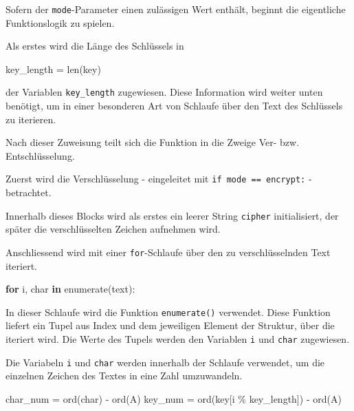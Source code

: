 \documentclass[
  nswissgerman,
  a4paper,
  DIV=11,
  numbers=noendperiod,
  ngerman]{scrreprt}
\newenvironment{Shaded}{\begin{snugshade}}{\end{snugshade}}
\newcommand{\BuiltInTok}[1]{\textcolor[rgb]{0.00,0.23,0.31}{#1}}
\newcommand{\ControlFlowTok}[1]{\textcolor[rgb]{0.00,0.23,0.31}{\textbf{#1}}}
\newcommand{\KeywordTok}[1]{\textcolor[rgb]{0.00,0.23,0.31}{\textbf{#1}}}
\newcommand{\NormalTok}[1]{\textcolor[rgb]{0.00,0.23,0.31}{#1}}
\newcommand{\OperatorTok}[1]{\textcolor[rgb]{0.37,0.37,0.37}{#1}}
\newcommand{\StringTok}[1]{\textcolor[rgb]{0.13,0.47,0.30}{#1}}
\begin{document}
Sofern der \texttt{mode}-Parameter einen zulässigen Wert enthält,
beginnt die eigentliche Funktionslogik zu spielen.

Als erstes wird die Länge des Schlüssels in

\begin{Shaded}
\begin{Highlighting}[numbers=left,,]
\NormalTok{key\_length }\OperatorTok{=} \BuiltInTok{len}\NormalTok{(key)}
\end{Highlighting}
\end{Shaded}

der Variablen \texttt{key\_length} zugewiesen. Diese Information wird
weiter unten benötigt, um in einer besonderen Art von Schlaufe über den
Text des Schlüssels zu iterieren.

Nach dieser Zuweisung teilt sich die Funktion in die Zweige Ver- bzw.
Entschlüsselung.

Zuerst wird die Verschlüsselung - eingeleitet mit
\texttt{if\ mode\ ==\ \textquotesingle{}encrypt\textquotesingle{}:} -
betrachtet.

Innerhalb dieses Blocks wird als erstes ein leerer String
\texttt{cipher} initialisiert, der später die verschlüsselten Zeichen
aufnehmen wird.

Anschliessend wird mit einer \texttt{for}-Schlaufe über den zu
verschlüsselnden Text iteriert.

\begin{Shaded}
\begin{Highlighting}[numbers=left,,]
\ControlFlowTok{for}\NormalTok{ i, char }\KeywordTok{in} \BuiltInTok{enumerate}\NormalTok{(text):}
\end{Highlighting}
\end{Shaded}

In dieser Schlaufe wird die Funktion \texttt{enumerate()} verwendet.
Diese Funktion liefert ein Tupel aus Index und dem jeweiligen Element
der Struktur, über die iteriert wird. Die Werte des Tupels werden den
Variablen \texttt{i} und \texttt{char} zugewiesen.

Die Variabeln \texttt{i} und \texttt{char} werden innerhalb der Schlaufe
verwendet, um die einzelnen Zeichen des Textes in eine Zahl umzuwandeln.

\begin{Shaded}
\begin{Highlighting}[numbers=left,,]
\NormalTok{    char\_num }\OperatorTok{=} \BuiltInTok{ord}\NormalTok{(char) }\OperatorTok{{-}} \BuiltInTok{ord}\NormalTok{(}\StringTok{\textquotesingle{}A\textquotesingle{}}\NormalTok{)}
\NormalTok{    key\_num }\OperatorTok{=} \BuiltInTok{ord}\NormalTok{(key[i }\OperatorTok{\%}\NormalTok{ key\_length]) }\OperatorTok{{-}} \BuiltInTok{ord}\NormalTok{(}\StringTok{\textquotesingle{}A\textquotesingle{}}\NormalTok{)}
\end{Highlighting}
\end{Shaded}
\end{document}
